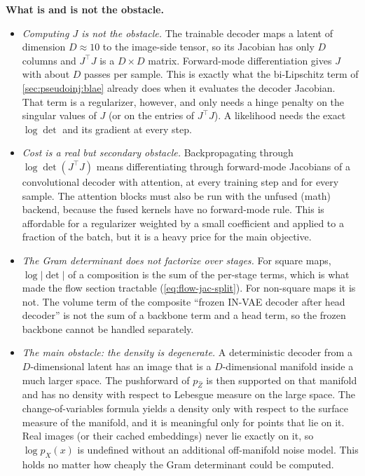 \textbf{What is and is not the obstacle.}
\begin{itemize}[leftmargin=1.5em]
\item \emph{Computing $J$ is not the obstacle.} The trainable decoder maps a latent of dimension $D\approx10$ to
      the image-side tensor, so its Jacobian has only $D$ columns and $J^\top J$ is a $D\times D$
      matrix. Forward-mode differentiation gives $J$ with about $D$ passes per sample. This is exactly
      what the bi-Lipschitz term of \cref{sec:pseudoinj:blae} already does when it evaluates the decoder
      Jacobian. That term is a regularizer, however, and only needs a hinge penalty on the
      singular values of $J$ (or on the entries of $J^\top J$). A likelihood needs the exact
      $\log\det$ and its gradient at every step.
\item \emph{Cost is a real but secondary obstacle.} Backpropagating through $\log\det(J^\top J)$ means
      differentiating through forward-mode Jacobians of a convolutional decoder with attention, at every
      training step and for every sample. The attention blocks must also be run with the unfused (math)
      backend, because the fused kernels have no forward-mode rule. This is affordable for a
      regularizer weighted by a small coefficient and applied to a fraction of the batch, but it is a
      heavy price for the main objective.
\item \emph{The Gram determinant does not factorize over stages.} For square maps, $\log|\det|$ of a
      composition is the sum of the per-stage terms, which is what made the flow section tractable
      (\cref{eq:flow-jac-split}). For non-square maps it is not. The volume term of the composite
      ``frozen IN-VAE decoder after head decoder'' is not the sum of a backbone term and a head term, so
      the frozen backbone cannot be handled separately.
\item \emph{The main obstacle: the density is degenerate.} A deterministic decoder from a
      $D$-dimensional latent has an image that is a $D$-dimensional manifold inside a much
      larger space. The pushforward of $p_{\hat Z}$ is then supported on that manifold and has no density
      with respect to Lebesgue measure on the large space. The change-of-variables formula yields a
      density only with respect to the surface measure of the manifold, and it is meaningful only for
      points that lie on it. Real images (or their cached embeddings) never lie exactly on it, so
      $\log p_X(x)$ is undefined without an additional off-manifold noise model. This holds no matter how
      cheaply the Gram determinant could be computed.
\end{itemize}

